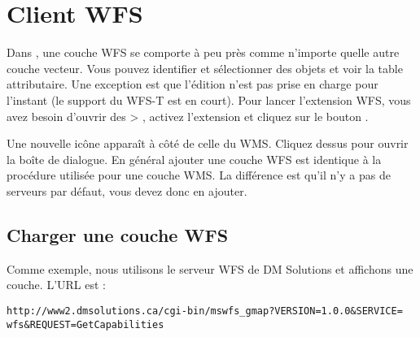 \section{Client WFS}\label{sec:ogc-wfs}

Dans \qg, une couche WFS se comporte à peu près comme n'importe quelle autre couche vecteur. Vous pouvez identifier et sélectionner des objets et voir la table attributaire. Une exception est que l'édition n'est pas prise en charge pour l'instant (le support du WFS-T est en court). Pour lancer l'extension WFS, vous avez besoin d'ouvrir des  > , activez l'extension  et cliquez sur le bouton .

Une nouvelle icône  apparaît à côté de celle du WMS. Cliquez dessus pour ouvrir la boîte de dialogue. En général ajouter une couche WFS est identique à la procédure utilisée pour une couche WMS. La différence est qu'il n'y a pas de serveurs par défaut, vous devez donc en ajouter.

\subsection{Charger une couche WFS}

Comme exemple, nous utilisons le serveur WFS de DM Solutions et affichons une
couche. L'URL est :
\begin{verbatim}
http://www2.dmsolutions.ca/cgi-bin/mswfs_gmap?VERSION=1.0.0&SERVICE=
wfs&REQUEST=GetCapabilities
\end{verbatim}

